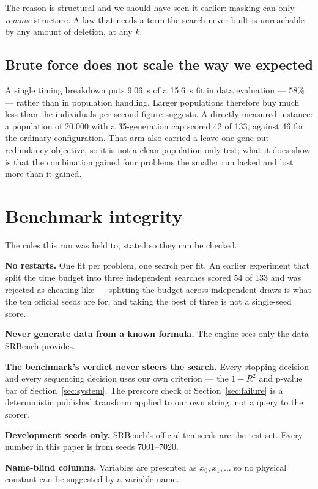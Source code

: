 \documentclass[11pt,a4paper]{article}
\begin{document}
The reason is structural and we should have seen it earlier: masking can only
\emph{remove} structure. A law that needs a term the search never built is
unreachable by any amount of deletion, at any $k$.

\subsection{Brute force does not scale the way we expected}

A single timing breakdown puts 9.06~s of a 15.6~s fit in data evaluation ---
58\% --- rather than in population handling. Larger populations therefore buy
much less than the individuals-per-second figure suggests. A directly measured instance:
a population of 20{,}000 with a 35-generation cap scored 42 of 133, against 46
for the ordinary configuration. That arm also carried a leave-one-gene-out
redundancy objective, so it is not a clean population-only test; what it does
show is that the combination gained four problems the smaller run lacked and
lost more than it gained.

\section{Benchmark integrity}
\label{sec:integrity}

The rules this run was held to, stated so they can be checked.

\textbf{No restarts.} One fit per problem, one search per fit. An earlier
experiment that split the time budget into three independent searches scored 54
of 133 and was rejected as cheating-like --- splitting the budget across
independent draws is what the ten official seeds are for, and taking the best of
three is not a single-seed score.

\textbf{Never generate data from a known formula.} The engine sees only the data
SRBench provides.

\textbf{The benchmark's verdict never steers the search.} Every stopping decision
and every sequencing decision uses our own criterion --- the $1-R^2$ and p-value
bar of Section~\ref{sec:system}. The prescore check of
Section~\ref{sec:failure} is a deterministic published transform applied to our
own string, not a query to the scorer.

\textbf{Development seeds only.} SRBench's official ten seeds are the test set.
Every number in this paper is from seeds 7001--7020.

\textbf{Name-blind columns.} Variables are presented as $x_0, x_1, \ldots$ so no
physical constant can be suggested by a variable name.
\end{document}
